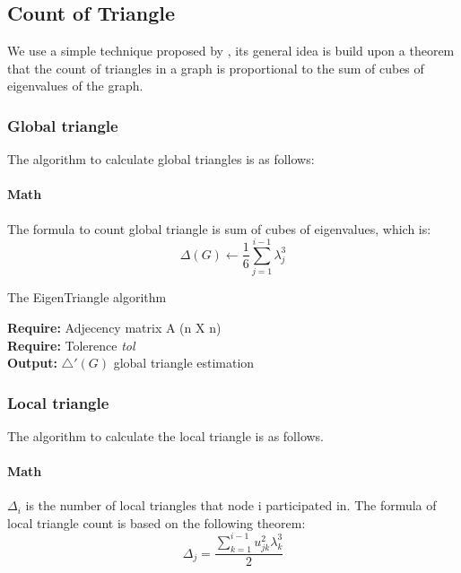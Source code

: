 \subsection{Count of Triangle}
We use a simple technique proposed by \cite{tsourakakis2008fast}, its general idea is build upon a theorem that the count of triangles in a graph is proportional to the sum of cubes of eigenvalues of the graph. 


\subsubsection{Global triangle}
The algorithm to calculate global triangles is as follows:

\paragraph{Math}
The formula to count global triangle is sum of cubes of eigenvalues, which is:
\begin{equation}
    \Delta(G) \gets \frac{1}{6} \sum_{j=1}^{i-1}\lambda_{j}^{3}
\end{equation}

\begin{algorithm}[!htbf]
\caption{The EigenTriangle algorithm}
{\bf Require: } Adjecency matrix A (n X n)\\
{\bf Require: } Tolerence \emph{tol}\\
{\bf Output: } $\bigtriangleup'(G)$ global triangle estimation
\begin{algorithmic}
\STATE{$\overrightarrow{\Lambda} \gets [\lambda_{1}]$}
\REPEAT 
\end{algorithmic}
\end{algorithm}

\subsubsection{Local triangle}
The algorithm to calculate the local triangle is as follows.

\paragraph{Math}
$\Delta_{i}$ is the number of local triangles that node i participated in. The formula of local triangle count is based on the following theorem:
\begin{equation}
    \Delta_{j} = \frac{\sum_{k=1}^{i-1}u_{jk}^{2}\lambda_{k}^{3}}{2}
\end{equation}


